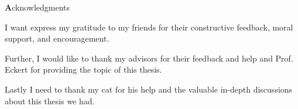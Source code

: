 
\vspace*{2cm}

\begin{center}
{ \textbf Acknowledgments}
\end{center}

\vspace{1cm}

\noindent
I want express my gratitude to my friends for their constructive feedback, moral support, and encouragement.

\noindent
Further, I would like to thank my advisors for their feedback and help and Prof. Eckert for providing the topic of this thesis.

\noindent
Lastly I need to thank my cat for his help and the valuable in-depth discussions about this thesis we had.

\cleardoublepage{}
